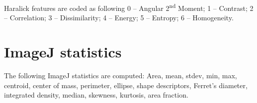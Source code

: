\documentclass{amsart}
\begin{document}
Haralick features \cite{Haralick1973} are coded as following
0 --  Angular 2\textsuperscript{nd} Moment;
1 -- Contrast;
2 -- Correlation;
3 -- Dissimilarity;
4 -- Energy;
5 -- Entropy;
6 -- Homogeneity.

\section{ImageJ statistics}\label{sec:istat}
The following ImageJ statistics are computed:
Area, mean, stdev, min, max, centroid, center of mass,  perimeter, ellipse, shape descriptors, Ferret's diameter, integrated density, median, skewness, kurtosis, area fraction.




\end{document}
